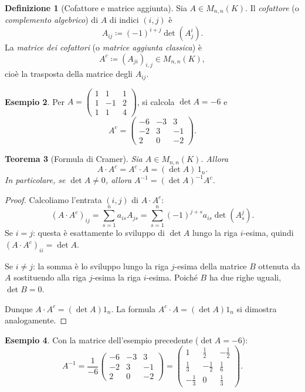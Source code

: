 \documentclass[11pt, a4paper]{book}
\theoremstyle{definition}
\newtheorem{definizione}{Definizione}[section]
\newtheorem{esempio}[definizione]{Esempio}
\theoremstyle{plain}
\newtheorem{teorema}[definizione]{Teorema}
\theoremstyle{remark}
\begin{document}
\begin{defbox}
\begin{definizione}[Cofattore e matrice aggiunta]
Sia $A \in M_{n,n}(K)$. Il \emph{cofattore} (o \emph{complemento algebrico}) di $A$ di indici $(i,j)$ è
\[
  A_{ij} \coloneqq (-1)^{i+j}\det(A^i_j).
\]
La \emph{matrice dei cofattori} (o \emph{matrice aggiunta classica}) è
\[
  A^c \coloneqq (A_{ji})_{i,j} \in M_{n,n}(K),
\]
cioè la trasposta della matrice degli $A_{ij}$.
\end{definizione}
\end{defbox}

\begin{exbox}
\begin{esempio}
Per $A = \begin{pmatrix}1&1&1\\1&-1&2\\1&1&4\end{pmatrix}$, si calcola $\det A = -6$ e
\[
  A^c = \begin{pmatrix}-6 & -3 & 3\\ -2 & 3 & -1 \\ 2 & 0 & -2\end{pmatrix}.
\]
\end{esempio}
\end{exbox}

\begin{teorema}[Formula di Cramer]
\label{thm:cramer}
Sia $A \in M_{n,n}(K)$. Allora
\[
  A \cdot A^c = A^c \cdot A = (\det A)\,1_n.
\]
In particolare, se $\det A \neq 0$, allora $A^{-1} = (\det A)^{-1} A^c$.
\end{teorema}

\begin{proof}
Calcoliamo l'entrata $(i,j)$ di $A \cdot A^c$:
\[
  (A \cdot A^c)_{ij} = \sum_{s=1}^n a_{is} A_{js} = \sum_{s=1}^n (-1)^{j+s} a_{is}\det(A^j_s).
\]
Se $i = j$: questa è esattamente lo sviluppo di $\det A$ lungo la riga $i$-esima, quindi $(A\cdot A^c)_{ii} = \det A$.

Se $i \neq j$: la somma è lo sviluppo lungo la riga $j$-esima della matrice $B$ ottenuta da $A$ sostituendo alla riga $j$-esima la riga $i$-esima. Poiché $B$ ha due righe uguali, $\det B = 0$.

Dunque $A \cdot A^c = (\det A)1_n$. La formula $A^c \cdot A = (\det A)1_n$ si dimostra analogamente.
\end{proof}

\begin{exbox}
\begin{esempio}
Con la matrice dell'esempio precedente ($\det A = -6$):
\[
  A^{-1} = \frac{1}{-6}\begin{pmatrix}-6&-3&3\\-2&3&-1\\2&0&-2\end{pmatrix}
  = \begin{pmatrix}1&\tfrac{1}{2}&-\tfrac{1}{2}\\\tfrac{1}{3}&-\tfrac{1}{2}&\tfrac{1}{6}\\-\tfrac{1}{3}&0&\tfrac{1}{3}\end{pmatrix}.
\]
\end{esempio}
\end{exbox}
\end{document}
